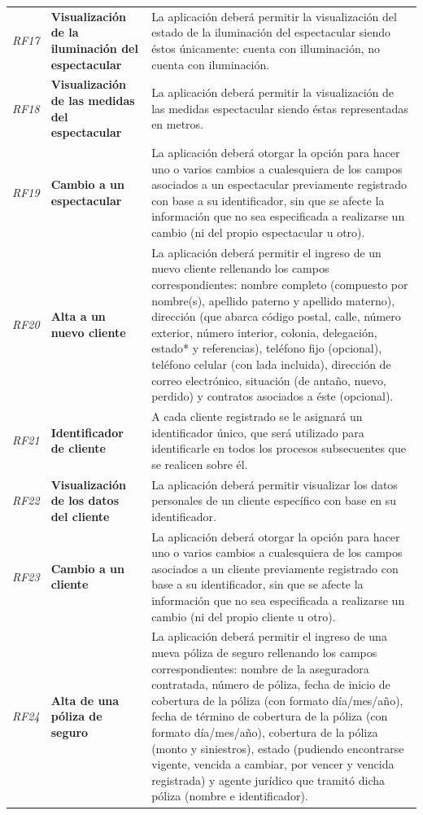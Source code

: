 \documentclass[12pt]{article}
\begin{document}
{\begin{longtable}[H]{m{2cm}m{4cm}m{6cm}}
    \textit{RF17} & \textbf{Visualización de la iluminación del espectacular} & La aplicación deberá permitir la visualización del estado de la iluminación del espectacular siendo éstos únicamente: cuenta con illuminación, no cuenta con iluminación. \tabularnewline
    \textit{RF18} & \textbf{Visualización de las medidas del espectacular} & La aplicación deberá permitir la visualización de las medidas espectacular siendo éstas representadas en metros. \tabularnewline
     \textit{RF19} & \textbf{Cambio a un espectacular} & La aplicación deberá otorgar la opción para hacer uno o varios cambios a cualesquiera de los campos asociados a un espectacular previamente registrado con base a su identificador, sin que se afecte la información que no sea especificada a realizarse un cambio (ni del propio espectacular u otro). \tabularnewline
     \textit{RF20} & \textbf{Alta a un nuevo cliente} & La aplicación deberá permitir el ingreso de un nuevo cliente rellenando los campos correspondientes: nombre completo (compuesto por nombre(s), apellido paterno y apellido materno), dirección (que abarca código postal, calle, número exterior, número interior, colonia, delegación, estado* y referencias), teléfono fijo (opcional), teléfono celular (con lada incluida), dirección de correo electrónico, situación (de antaño, nuevo, perdido) y contratos asociados a éste (opcional).\tabularnewline
     \textit{RF21} & \textbf{Identificador de cliente} & A cada cliente registrado se le asignará un identificador único, que será utilizado para identificarle en todos los procesos subsecuentes que se realicen sobre él.\tabularnewline
     \textit{RF22} & \textbf{Visualización de los datos del cliente} & La aplicación deberá permitir visualizar los datos personales de un cliente específico con base en su identificador.\tabularnewline
     \textit{RF23} & \textbf{Cambio a un cliente} & La aplicación deberá otorgar la opción para hacer uno o varios cambios a cualesquiera de los campos asociados a un cliente previamente registrado con base a su identificador, sin que se afecte la información que no sea especificada a realizarse un cambio (ni del propio cliente u otro).\tabularnewline
     \textit{RF24} & \textbf{Alta de una póliza de seguro} & La aplicación deberá permitir el ingreso de una nueva póliza de seguro rellenando los campos correspondientes: nombre de la aseguradora contratada, número de póliza, fecha de inicio de cobertura de la póliza (con formato día/mes/año), fecha de término de cobertura de la póliza (con formato día/mes/año), cobertura de la póliza (monto y siniestros), estado (pudiendo encontrarse vigente, vencida a cambiar, por vencer y vencida registrada) y agente jurídico que tramitó dicha póliza (nombre e identificador).\tabularnewline

\end{longtable}}
\end{document}

